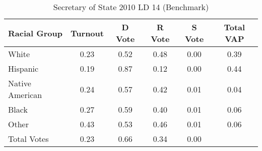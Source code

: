 \begin{table}[htb]
\begin{center}
\caption{Secretary of State 2010 LD 14 (Benchmark)}
\label{sos10_vap_ld_14_benchmark}
\begin{tabular}{lccccc}
  \hline
Racial Group & Turnout & D Vote & R Vote & S Vote & Total VAP \\ 
  \hline
White & 0.23 & 0.52 & 0.48 & 0.00 & 0.39 \\ 
  Hispanic & 0.19 & 0.87 & 0.12 & 0.00 & 0.44 \\ 
  Native American & 0.24 & 0.57 & 0.42 & 0.01 & 0.04 \\ 
  Black & 0.27 & 0.59 & 0.40 & 0.01 & 0.06 \\ 
  Other & 0.43 & 0.53 & 0.46 & 0.01 & 0.06 \\ 
  Total Votes & 0.23 & 0.66 & 0.34 & 0.00 &  \\ 
   \hline
\end{tabular}
\end{center}
\end{table}
